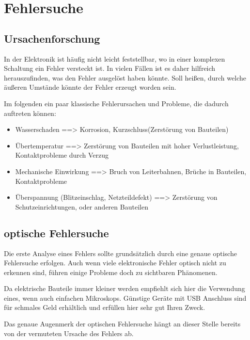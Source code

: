 \section{Fehlersuche}

\subsection{Ursachenforschung}

In der Elektronik ist häufig nicht leicht feststellbar, wo in einer komplexen Schaltung ein Fehler versteckt ist.
In vielen Fällen ist es daher hilfreich herauszufinden, was den Fehler ausgelöst haben könnte.
Soll heißen, durch welche äußeren Umstände könnte der Fehler erzeugt worden sein.

Im folgenden ein paar klassische Fehlerursachen und Probleme, die dadurch auftreten können:

\begin{itemize}
	\item Wasserschaden ==> Korrosion, Kurzschluss(Zerstörung von Bauteilen)
	\item Übertemperatur ==> Zerstörung von Bauteilen mit hoher Verlustleistung, Kontaktprobleme durch Verzug
	\item Mechanische Einwirkung ==> Bruch von Leiterbahnen, Brüche in Bauteilen, Kontaktprobleme
	\item Überspannung (Blitzeinschlag, Netzteildefekt) ==> Zerstörung von Schutzeinrichtungen, oder anderen Bauteilen
\end{itemize}



\subsection{optische Fehlersuche}

Die erste Analyse eines Fehlers sollte grundsätzlich durch eine genaue optische Fehlersuche erfolgen.
Auch wenn viele elektronische Fehler optisch nicht zu erkennen sind, führen einige Probleme doch zu sichtbaren Phänomenen.

Da elektrische Bauteile immer kleiner werden empfiehlt sich hier die Verwendung eines, wenn auch einfachen Mikroskops. Günstige Geräte mit USB Anschluss sind für schmales Geld erhältlich und erfüllen hier sehr gut Ihren Zweck.

Das genaue Augenmerk der optischen Fehlersuche hängt an dieser Stelle bereits von der vermuteten Ursache des Fehlers ab.

